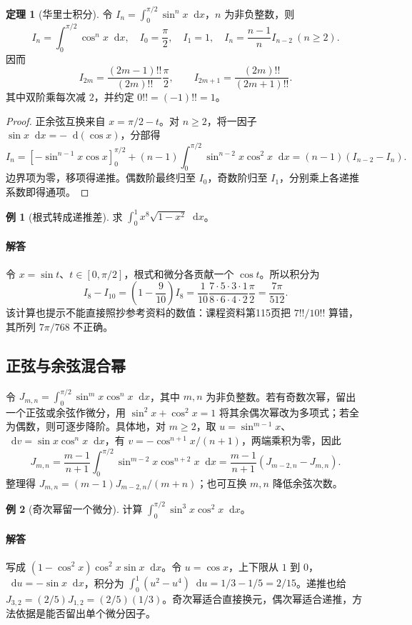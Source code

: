 \documentclass[UTF8,fontset=fandol,12pt,oneside,openany]{ctexrep}
\newcommand{\dd}{\mathop{}\!\mathrm d}
\theoremstyle{definition}
\newtheorem{theorem}{定理}[chapter]
\newtheorem{example}{例}[chapter]
\begin{document}
\begin{theorem}[华里士积分]
令 $I_n=\int_0^{\pi/2}\sin^nx\dd x$，$n$ 为非负整数，则
\[I_n=\int_0^{\pi/2}\cos^nx\dd x,\quad I_0=\frac\pi2,\quad I_1=1,\quad I_n=\frac{n-1}n I_{n-2}\ (n\ge2).\]
因而
\[I_{2m}=\frac{(2m-1)!!}{(2m)!!}\frac\pi2,\qquad I_{2m+1}=\frac{(2m)!!}{(2m+1)!!}.\]
其中双阶乘每次减 $2$，并约定 $0!!=(-1)!!=1$。
\end{theorem}
\begin{proof}
正余弦互换来自 $x=\pi/2-t$。对 $n\ge2$，将一因子 $\sin x\dd x=-\dd(\cos x)$，分部得
\[I_n=[-\sin^{n-1}x\cos x]_0^{\pi/2}+(n-1)\int_0^{\pi/2}\sin^{n-2}x\cos^2x\dd x
=(n-1)(I_{n-2}-I_n).\]
边界项为零，移项得递推。偶数阶最终归至 $I_0$，奇数阶归至 $I_1$，分别乘上各递推系数即得通项。
\end{proof}
\begin{example}[根式转成递推差]
求 $\int_0^1x^8\sqrt{1-x^2}\dd x$。
\end{example}
\paragraph{解答} 令 $x=\sin t$、$t\in[0,\pi/2]$，根式和微分各贡献一个 $\cos t$。所以积分为
\[I_8-I_{10}=\left(1-\frac9{10}\right)I_8
=\frac1{10}\frac{7\cdot5\cdot3\cdot1}{8\cdot6\cdot4\cdot2}\frac\pi2=\frac{7\pi}{512}.\]
该计算也提示不能直接照抄参考资料的数值：课程资料第115页把 $7!!/10!!$ 算错，其所列 $7\pi/768$ 不正确。

\subsection{正弦与余弦混合幂}
令 $J_{m,n}=\int_0^{\pi/2}\sin^m x\cos^n x\dd x$，其中 $m,n$ 为非负整数。若有奇数次幂，留出一个正弦或余弦作微分，用 $\sin^2x+\cos^2x=1$ 将其余偶次幂改为多项式；若全为偶数，则可逐步降阶。具体地，对 $m\ge2$，取 $u=\sin^{m-1}x$、$\dd v=\sin x\cos^nx\dd x$，有 $v=-\cos^{n+1}x/(n+1)$，两端乘积为零，因此
\[J_{m,n}=\frac{m-1}{n+1}\int_0^{\pi/2}\sin^{m-2}x\cos^{n+2}x\dd x
=\frac{m-1}{n+1}(J_{m-2,n}-J_{m,n}).\]
整理得 $J_{m,n}=(m-1)J_{m-2,n}/(m+n)$；也可互换 $m,n$ 降低余弦次数。
\begin{example}[奇次幂留一个微分]
计算 $\int_0^{\pi/2}\sin^3x\cos^2x\dd x$。
\end{example}
\paragraph{解答} 写成 $(1-\cos^2x)\cos^2x\sin x\dd x$。令 $u=\cos x$，上下限从 $1$ 到 $0$，$\dd u=-\sin x\dd x$，积分为 $\int_0^1(u^2-u^4)\dd u=1/3-1/5=2/15$。递推也给 $J_{3,2}=(2/5)J_{1,2}=(2/5)(1/3)$。奇次幂适合直接换元，偶次幂适合递推，方法依据是能否留出单个微分因子。
\end{document}

